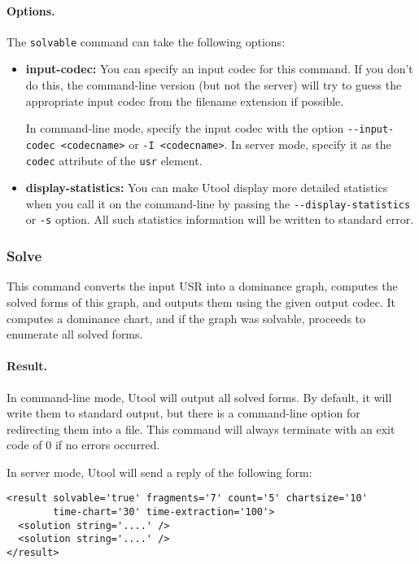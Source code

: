 \paragraph{Options.}
The \verb?solvable? command can take the following options:
\begin{itemize}
\item \textbf{input-codec:} You can specify an input codec for this
command. If you don't do this, the command-line version (but not the
server) will try to guess the appropriate input codec from the
filename extension if possible.

In command-line mode, specify the input codec with the option
\verb?--input-codec <codecname>? or \verb?-I <codecname>?. In server
mode, specify it as the \verb?codec? attribute of the \verb?usr?
element.

\item \textbf{display-statistics:} You can make Utool display more detailed
statistics when you call it on the command-line by passing the
\verb?--display-statistics? or \verb?-s? option. All such statistics
information will be written to standard error.
\end{itemize}




\subsubsection{Solve}

This command converts the input USR into a dominance graph, computes
the solved forms of this graph, and outputs them using the given
output codec. It computes a dominance chart, and if the graph was
solvable, proceeds to enumerate all solved forms.


\paragraph{Result.}
In command-line mode, Utool will output all solved forms. By default,
it will write them to standard output, but there is a command-line
option for redirecting them into a file. This command will always
terminate with an exit code of 0 if no errors occurred.

In server mode, Utool will send a reply of the following form:
\begin{verbatim}
<result solvable='true' fragments='7' count='5' chartsize='10'
        time-chart='30' time-extraction='100'>
  <solution string='....' />
  <solution string='....' />
</result>
\end{verbatim}

